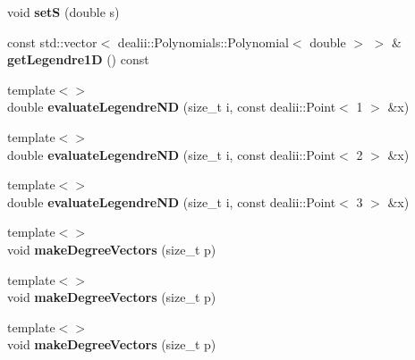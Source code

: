 \begin{DoxyCompactItemize}
\item 
\hypertarget{classnatrium_1_1ExponentialFilter_ab61c1212b23fcd100a0c2462cdc27d06}{
void {\bfseries setS} (double s)}
\label{classnatrium_1_1ExponentialFilter_ab61c1212b23fcd100a0c2462cdc27d06}

\item 
\hypertarget{classnatrium_1_1ExponentialFilter_a30884f098ca5df395bba0d37c3385184}{
const std::vector$<$ dealii::Polynomials::Polynomial$<$ double $>$ $>$ \& {\bfseries getLegendre1D} () const }
\label{classnatrium_1_1ExponentialFilter_a30884f098ca5df395bba0d37c3385184}

\item 
\hypertarget{classnatrium_1_1ExponentialFilter_a9fe9da3ede007415db46ee5c62223535}{
{\footnotesize template$<$$>$ }\\double {\bfseries evaluateLegendreND} (size\_\-t i, const dealii::Point$<$ 1 $>$ \&x)}
\label{classnatrium_1_1ExponentialFilter_a9fe9da3ede007415db46ee5c62223535}

\item 
\hypertarget{classnatrium_1_1ExponentialFilter_a29fc75a80593da48dce8952285aed50d}{
{\footnotesize template$<$$>$ }\\double {\bfseries evaluateLegendreND} (size\_\-t i, const dealii::Point$<$ 2 $>$ \&x)}
\label{classnatrium_1_1ExponentialFilter_a29fc75a80593da48dce8952285aed50d}

\item 
\hypertarget{classnatrium_1_1ExponentialFilter_ac586f11dc29e09c1574bccb8b50e7fdd}{
{\footnotesize template$<$$>$ }\\double {\bfseries evaluateLegendreND} (size\_\-t i, const dealii::Point$<$ 3 $>$ \&x)}
\label{classnatrium_1_1ExponentialFilter_ac586f11dc29e09c1574bccb8b50e7fdd}

\item 
\hypertarget{classnatrium_1_1ExponentialFilter_ace2bb21168e12db57aa8be0a99f74deb}{
{\footnotesize template$<$$>$ }\\void {\bfseries makeDegreeVectors} (size\_\-t p)}
\label{classnatrium_1_1ExponentialFilter_ace2bb21168e12db57aa8be0a99f74deb}

\item 
\hypertarget{classnatrium_1_1ExponentialFilter_ab461e610fef0cc607fa182359c1ca565}{
{\footnotesize template$<$$>$ }\\void {\bfseries makeDegreeVectors} (size\_\-t p)}
\label{classnatrium_1_1ExponentialFilter_ab461e610fef0cc607fa182359c1ca565}

\item 
\hypertarget{classnatrium_1_1ExponentialFilter_a530018ea2309c14f641f03a9d38dcf21}{
{\footnotesize template$<$$>$ }\\void {\bfseries makeDegreeVectors} (size\_\-t p)}
\label{classnatrium_1_1ExponentialFilter_a530018ea2309c14f641f03a9d38dcf21}

\end{DoxyCompactItemize}


